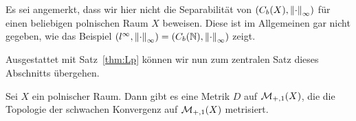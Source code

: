 \documentclass[../main/main.tex]{subfiles}
\begin{document}
	\begin{Bemerkung}
		Es sei angemerkt, dass wir hier nicht die Separabilität von $(C_b(X), \left\lVert\cdot\right\rVert_\infty)$ 
		für einen beliebigen polnischen Raum $X$ beweisen. Diese ist im Allgemeinen gar nicht gegeben, wie das Beispiel
		$(l^\infty, \left\lVert\cdot\right\rVert_\infty) = (C_b(\mathbb{N}), \left\lVert\cdot\right\rVert_\infty)$ zeigt.
	\end{Bemerkung}

	Ausgestattet mit Satz~\ref{thm:Lp} können wir nun zum zentralen Satz dieses Abschnitts übergehen.
	
	\begin{Satz}
		\label{thm:weakconvergencemetrizable}
		Sei $X$ ein polnischer Raum. Dann gibt es eine Metrik $D$ auf $\mathcal{M}_{+,1}(X)$, 
		die die Topologie der schwachen Konvergenz auf $\mathcal{M}_{+,1}(X)$ metrisiert.
	\end{Satz}

	
\end{document}
